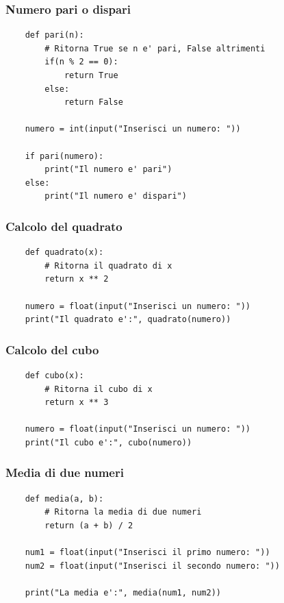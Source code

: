 \documentclass[a4paper,12pt]{article}
\begin{document}
\newpage

\subsubsection{Numero pari o dispari}

\begin{lstlisting}
	def pari(n):
		# Ritorna True se n e' pari, False altrimenti
		if(n % 2 == 0):
			return True
		else:
			return False
	
	numero = int(input("Inserisci un numero: "))
	
	if pari(numero):
		print("Il numero e' pari")
	else:
		print("Il numero e' dispari")
\end{lstlisting}

\newpage


\subsubsection{Calcolo del quadrato}

\begin{lstlisting}
	def quadrato(x):
		# Ritorna il quadrato di x
		return x ** 2
	
	numero = float(input("Inserisci un numero: "))
	print("Il quadrato e':", quadrato(numero))
\end{lstlisting}

\newpage

\subsubsection{Calcolo del cubo}

\begin{lstlisting}
	def cubo(x):
		# Ritorna il cubo di x
		return x ** 3
	
	numero = float(input("Inserisci un numero: "))
	print("Il cubo e':", cubo(numero))
\end{lstlisting}

\newpage

\subsubsection{Media di due numeri}

\begin{lstlisting}
	def media(a, b):
		# Ritorna la media di due numeri
		return (a + b) / 2
	
	num1 = float(input("Inserisci il primo numero: "))
	num2 = float(input("Inserisci il secondo numero: "))
	
	print("La media e':", media(num1, num2))
\end{lstlisting}
\end{document}
